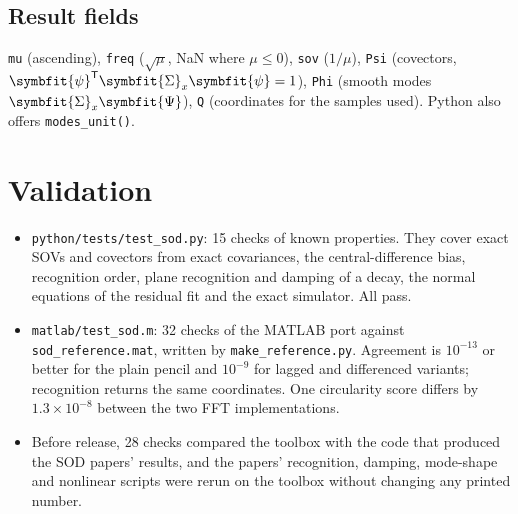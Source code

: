 \documentclass[report]{nld}
\newcommand{\Sg}{{\symbfit{\Sigma}}}
\newcommand{\Ps}{{\symbfit{\Psi}}}
\newcommand{\psib}{{\symbfit{\psi}}}
\newcommand{\code}[1]{\texttt{#1}}
\begin{document}
\subsection{Result fields}
\code{mu} (ascending), \code{freq} ($\sqrt{\mu}$, NaN where $\mu\le0$), \code{sov}
($1/\mu$), \code{Psi} (covectors, $\psib^{\mathsf T}\Sg_x\psib=1$), \code{Phi} (smooth modes
$\Sg_x\Ps$), \code{Q} (coordinates for the samples used). Python also offers
\code{modes\_unit()}.

\section{Validation}

\begin{itemize}
  \item \code{python/tests/test\_sod.py}: 15 checks of known properties. They cover
    exact SOVs and covectors from exact covariances, the central-difference bias,
    recognition order, plane recognition and damping of a decay, the normal equations
    of the residual fit and the exact simulator. All pass.
  \item \code{matlab/test\_sod.m}: 32 checks of the MATLAB port against
    \code{sod\_reference.mat}, written by \code{make\_reference.py}. Agreement is
    $10^{-13}$ or better for the plain pencil and $10^{-9}$ for lagged and differenced
    variants; recognition returns the same coordinates. One circularity score differs by
    $1.3\times10^{-8}$ between the two FFT implementations.
  \item Before release, 28 checks compared the toolbox with the code that produced the
    SOD papers' results, and the papers' recognition, damping, mode-shape and nonlinear
    scripts were rerun on the toolbox without changing any printed number.
\end{itemize}

\end{document}
